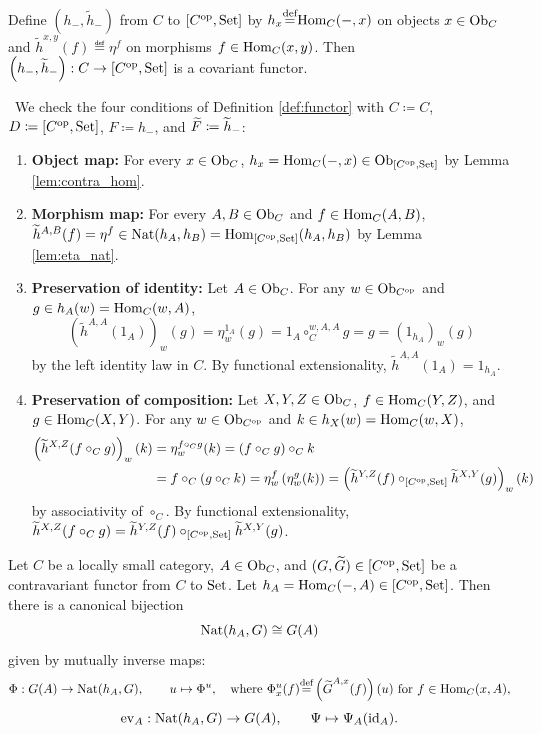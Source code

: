 \documentclass[10pt,a4paper]{article}
\begin{document}
\myqed
\begin{lemma}\label{lem:yoneda_functor}
Define $\left(h_-, \widetilde{h}_-\right)$ from $C$ to $[C^{\textrm{op}}, {\textrm{Set}}]$ by $h_x {\stackrel{{\textrm{def}}}{=}} {\textrm{Hom}}_C(-,x)$ on objects $x \in {\textrm{Ob}}_C$ and $\widetilde{h}^{x,y}(f) \eqdef \eta^f$ on morphisms $f \in {\textrm{Hom}}_C(x,y)$. Then $\left(h_-, \widetilde{h}_-\right) : C \to [C^{\textrm{op}}, {\textrm{Set}}]$ is a covariant functor.
\end{lemma}
\myprf\ We check the four conditions of Definition \ref{def:functor} with $C \coloneqq C$, $D \coloneqq [C^{\textrm{op}},{\textrm{Set}}]$, $F \coloneqq h_-$, and ${\widetilde{F}\textrm{}} \coloneqq \widetilde{h}_-$:
\begin{enumerate}
\item \textbf{Object map:} For every $x \in {\textrm{Ob}}_C$, $h_x = {\textrm{Hom}}_C(-,x) \in {\textrm{Ob}}_{[C^{\textrm{op}},{\textrm{Set}}]}$ by Lemma \ref{lem:contra_hom}.
\item \textbf{Morphism map:} For every $A,B \in {\textrm{Ob}}_C$ and $f \in {\textrm{Hom}}_C(A,B)$, $\widetilde{h}^{A,B}(f) = \eta^f \in {\textrm{Nat}}(h_A, h_B) = {\textrm{Hom}}_{[C^{\textrm{op}},{\textrm{Set}}]}(h_A, h_B)$ by Lemma \ref{lem:eta_nat}.
\item \textbf{Preservation of identity:} Let $A \in {\textrm{Ob}}_C$. For any $w \in {\textrm{Ob}}_{C^{\textrm{op}}}$ and $g \in h_A(w) = {\textrm{Hom}}_C(w,A)$,
$$\left(\widetilde{h}^{A,A}(1_A)\right)_w(g) = \eta^{1_A}_w(g) = 1_A \circ_C^{w,A,A} g = g = \left(1_{h_A}\right)_w(g)$$
by the left identity law in $C$. By functional extensionality, $\widetilde{h}^{A,A}(1_A) = 1_{h_A}$.
\item \textbf{Preservation of composition:} Let $X,Y,Z \in {\textrm{Ob}}_C$, $f \in {\textrm{Hom}}_C(Y,Z)$, and $g \in {\textrm{Hom}}_C(X,Y)$. For any $w \in {\textrm{Ob}}_{C^{\textrm{op}}}$ and $k \in h_X(w) = {\textrm{Hom}}_C(w,X)$,
\begin{align*}
\left(\widetilde{h}^{X,Z}(f \circ_C g)\right)_w(k) &= \eta^{f \circ_C g}_w(k) = (f \circ_C g) \circ_C k \\
&= f \circ_C (g \circ_C k) = \eta^f_w\left(\eta^g_w(k)\right) = \left(\widetilde{h}^{Y,Z}(f) \circ_{[C^{\textrm{op}},{\textrm{Set}}]} \widetilde{h}^{X,Y}(g)\right)_w(k)
\end{align*}
by associativity of $\circ_C$. By functional extensionality, $\widetilde{h}^{X,Z}(f \circ_C g) = \widetilde{h}^{Y,Z}(f) \circ_{[C^{\textrm{op}},{\textrm{Set}}]} \widetilde{h}^{X,Y}(g)$.
\end{enumerate}
\myqed
\begin{theorem}\label{thm:yoneda_contra}
Let $C$ be a locally small category, $A \in {\textrm{Ob}}_C$, and $(G, {\widetilde{G}\textrm{}}) \in [C^{\textrm{op}}, {\textrm{Set}}]$ be a contravariant functor from $C$ to ${\textrm{Set}}$. Let $h_A = {\textrm{Hom}}_C(-,A) \in [C^{\textrm{op}}, {\textrm{Set}}]$. Then there is a canonical bijection
$${\textrm{Nat}}(h_A, G) \cong G(A)$$
given by mutually inverse maps:
$$\Phi : G(A) \to {\textrm{Nat}}(h_A, G), \qquad u \mapsto \Phi^u, \quad \textrm{where } \Phi^u_x(f) {\stackrel{{\textrm{def}}}{=}} \left({\widetilde{G}\textrm{}}^{A,x}(f)\right)(u) \textrm{ for } f \in {\textrm{Hom}}_C(x,A),$$
$$\mathrm{ev}_A : {\textrm{Nat}}(h_A, G) \to G(A), \qquad \Psi \mapsto \Psi_A({\textrm{id}}_A).$$
\end{theorem}
\end{document}
